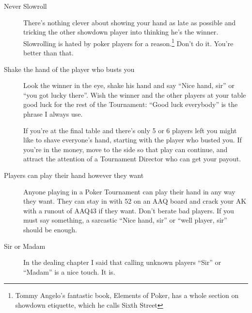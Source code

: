 \begin{description}

\item[Never Slowroll]  There's nothing clever about showing your hand
as late as possible and tricking the other showdown player into thinking
he's the winner. Slowrolling is hated by poker players for a
reason.\footnote{Tommy Angelo's fantastic book, Elements of Poker, has
a whole section on showdown etiquette, which he calls Sixth Street}
Don't do it. You're better than that.


\item[Shake the hand of the player who busts you] Look the winner in the
eye, shake his hand and say ``Nice hand, sir'' or ``you got lucky there''.
Wish the winner and the other players at your table good luck for the
rest of the Tournament: ``Good luck everybody'' is the phrase I always use.

If you're at the final table and there's only 5 or 6 players left you
might like to shave everyone's hand, starting with the player who
busted you. If you're in the money, move to the side so that play
can continue, and attract the attention of a Tournament Director who
can get your payout.

\item[Players can play their hand however they want] Anyone playing in
a Poker Tournament can play their hand in any way they want. They
can stay in with 52 on an AAQ board and crack your AK with a runout
of AAQ43 if they want. Don't berate bad players. If you must say
something, a sarcastic ``Nice hand, sir'' or ``well player, sir'' should
be enough.

\item[Sir or Madam] In the dealing chapter I said that calling
unknown players ``Sir'' or ``Madam'' is a nice touch. It is.

\end{description}
